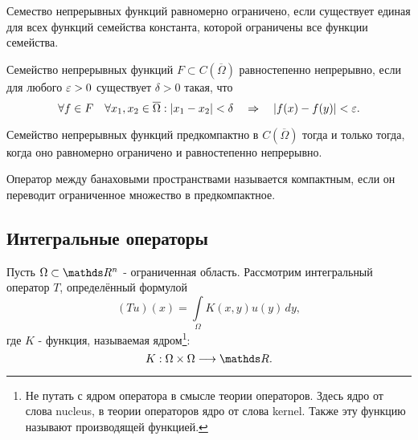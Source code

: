 \begin{definition}
Семество непрерывных функций равномерно ограничено, если существует единая для всех функций семейства константа, которой ограничены все функции семейства.
\end{definition}

\begin{definition}
Семейство непрерывных функций $F \subset C(\overline{\Omega})$ равностепенно непрерывно, если для любого $\varepsilon >0$  существует $\delta >0$ такая, что
$$ \forall f \in F \quad \forall x_1,x_2 \in \overline{\Omega} : | x_1 - x_2 | < \delta \quad \Rightarrow \quad |f(x) - f(y)| < \varepsilon .$$ 
\end{definition}

\begin{theorem}
Семейство непрерывных функций предкомпактно в $C(\overline{\Omega})$ тогда и только тогда, когда оно равномерно ограничено и равностепенно непрерывно.
\end{theorem}

\begin{definition}
Оператор между банаховыми пространствами называется компактным, если он переводит ограниченное множество в предкомпактное.
\end{definition}

\subsection{Интегральные операторы}
Пусть $\Omega \subset \real^n$ - ограниченная область.
Рассмотрим интегральный оператор $T$, определённый формулой
$$ (Tu)(x) = \int \limits_\Omega K(x,y) u(y) \, dy,$$
где $K$ - функция, называемая ядром\footnote{Не путать с ядром оператора в смысле теории операторов. Здесь ядро от слова nucleus, в теории операторов ядро от слова kernel. Также эту функцию называют производящей функцией.}:
$$ K : \Omega \times \Omega \longrightarrow \real.$$

